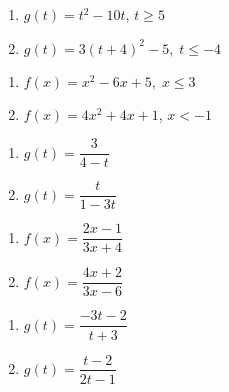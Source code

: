 \documentclass{ximera}
\begin{document}
\begin{multicols}{2}
\begin{enumerate}
\setcounter{enumi}{\value{HW}}

\item $g(t) = t^2 - 10t$, $t \geq 5$
\item $g(t) = 3(t + 4)^{2} - 5, \; t \leq -4$

\setcounter{HW}{\value{enumi}}
\end{enumerate}
\end{multicols}


\begin{multicols}{2}
\begin{enumerate}
\setcounter{enumi}{\value{HW}}

\item $f(x) = x^2-6x+5, \; x \leq 3$
\item $f(x) = 4x^2 + 4x + 1$, $x < -1$

\setcounter{HW}{\value{enumi}}
\end{enumerate}
\end{multicols}


\begin{multicols}{2}
\begin{enumerate}
\setcounter{enumi}{\value{HW}}

\item $g(t) = \dfrac{3}{4-t}$
\item $g(t) = \dfrac{t}{1-3t}$

\setcounter{HW}{\value{enumi}}
\end{enumerate}
\end{multicols}


\begin{multicols}{2}
\begin{enumerate}
\setcounter{enumi}{\value{HW}}

\item $f(x) = \dfrac{2x-1}{3x+4}$
\item $f(x) = \dfrac{4x + 2}{3x - 6}$

\setcounter{HW}{\value{enumi}}
\end{enumerate}
\end{multicols}


\begin{multicols}{2}
\begin{enumerate}
\setcounter{enumi}{\value{HW}}

\item $g(t) = \dfrac{-3t - 2}{t + 3}$ 

\item $g(t) = \dfrac{t-2}{2t-1}$  \label{inversehwlast}

\setcounter{HW}{\value{enumi}}
\end{enumerate}
\end{multicols}
\end{document}
